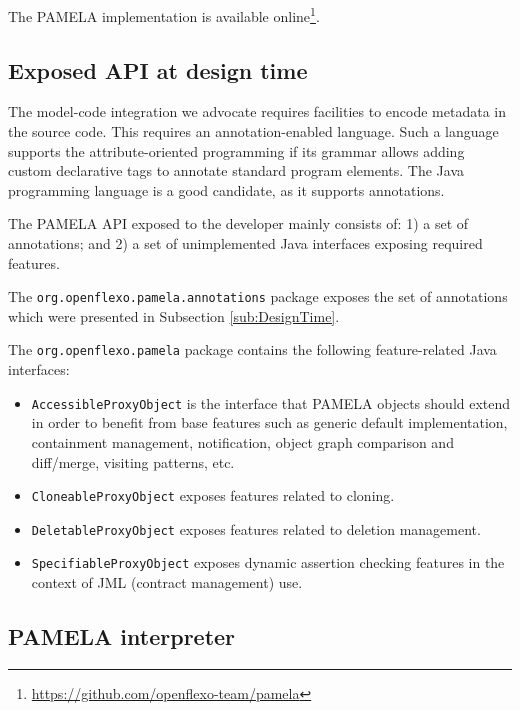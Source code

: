The PAMELA implementation is available online\footnote {\url{https://github.com/openflexo-team/pamela}}.

\subsection{Exposed API at design time}

The model-code integration we advocate requires facilities to encode metadata in the source code. This requires an annotation-enabled language. Such a language supports the attribute-oriented programming if its grammar allows adding custom declarative tags to annotate standard program elements. The Java programming language is a good candidate, as it supports annotations.

The PAMELA API exposed to the developer mainly consists of: 1) a set of annotations; and 2) a set of unimplemented Java interfaces exposing required features.

The \texttt{org.openflexo.pamela.annotations} package exposes the set of annotations which were presented in Subsection \ref{sub:DesignTime}.

The \texttt{org.openflexo.pamela} package contains the following feature-related Java interfaces:
\begin{itemize}
    \item \texttt{AccessibleProxyObject} is the interface that PAMELA objects should extend in order to benefit from base features such as generic default implementation, containment management, notification, object graph comparison and diff/merge, visiting patterns, etc.
    \item \texttt{CloneableProxyObject} exposes features related to cloning.
    \item \texttt{DeletableProxyObject} exposes features related to deletion management.
    \item \texttt{SpecifiableProxyObject} exposes dynamic assertion checking features in the context of JML (contract management) use. 
\end{itemize}


\subsection{PAMELA interpreter}

